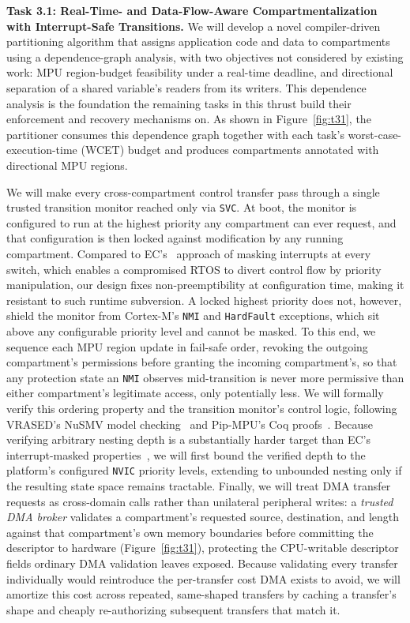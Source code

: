 \textbf{Task 3.1: Real-Time- and Data-Flow-Aware Compartmentalization with Interrupt-Safe Transitions.}
We will develop a novel compiler-driven partitioning algorithm that assigns application code and data to compartments using a dependence-graph analysis, with two objectives not considered by existing work: MPU region-budget feasibility under a real-time deadline, and directional separation of a shared variable's readers from its writers.
This dependence analysis is the foundation the remaining tasks in this thrust build their enforcement and recovery mechanisms on.
As shown in Figure~\ref{fig:t31}, the partitioner consumes this dependence graph together with each task's worst-case-execution-time (WCET) budget and produces compartments annotated with directional MPU regions.


We will make every cross-compartment control transfer pass through a single trusted transition monitor reached only via \texttt{SVC}.
At boot, the monitor is configured to run at the highest priority any compartment can ever request, and that configuration is then locked against modification by any running compartment.
Compared to EC's~\cite{khan2023ec} approach of masking interrupts at every switch, which enables a compromised RTOS to divert control flow by priority manipulation, our design fixes non-preemptibility at configuration time, making it resistant to such runtime subversion.
A locked highest priority does not, however, shield the monitor from Cortex-M's \texttt{NMI} and \texttt{HardFault} exceptions, which sit above any configurable priority level and cannot be masked.
To this end, we sequence each MPU region update in fail-safe order, revoking the outgoing compartment's permissions before granting the incoming compartment's, so that any protection state an \texttt{NMI} observes mid-transition is never more permissive than either compartment's legitimate access, only potentially less.
We will formally verify this ordering property and the transition monitor's control logic, following VRASED's NuSMV model checking~\cite{nunes2019vrased,cimatti2002nusmv} and Pip-MPU's Coq proofs~\cite{dejon2023pip}.
Because verifying arbitrary nesting depth is a substantially harder target than EC's interrupt-masked properties~\cite{khan2023ec}, we will first bound the verified depth to the platform's configured \texttt{NVIC} priority levels, extending to unbounded nesting only if the resulting state space remains tractable.
Finally, we will treat DMA transfer requests as cross-domain calls rather than unilateral peripheral writes: a \textit{trusted DMA broker} validates a compartment's requested source, destination, and length against that compartment's own memory boundaries before committing the descriptor to hardware (Figure~\ref{fig:t31}), protecting the CPU-writable descriptor fields ordinary DMA validation leaves exposed.
Because validating every transfer individually would reintroduce the per-transfer cost DMA exists to avoid, we will amortize this cost across repeated, same-shaped transfers by caching a transfer's shape and cheaply re-authorizing subsequent transfers that match it.

